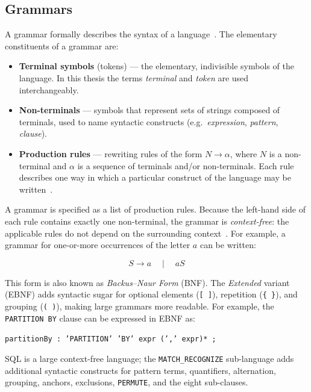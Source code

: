 \subsection{Grammars}
\label{subsec:meth-grammars}

A grammar formally describes the syntax of a language~\cite{DragonBook}.
The elementary constituents of a grammar are:

\begin{itemize}
  \item \textbf{Terminal symbols} (tokens) --- the elementary,
    indivisible symbols of the language.  In this thesis the terms
    \emph{terminal} and \emph{token} are used interchangeably.
  \item \textbf{Non-terminals} --- symbols that represent sets of
    strings composed of terminals, used to name syntactic constructs
    (e.g.\ \emph{expression}, \emph{pattern}, \emph{clause}).
  \item \textbf{Production rules} --- rewriting rules of the form
    $N \to \alpha$, where $N$ is a non-terminal and $\alpha$ is a
    sequence of terminals and/or non-terminals.  Each rule describes
    one way in which a particular construct of the language may be
    written~\cite{wagenknecht2022formal}.
\end{itemize}

A grammar is specified as a list of production rules.  Because the
left-hand side of each rule contains exactly one non-terminal, the
grammar is \emph{context-free}: the applicable rules do not depend
on the surrounding context~\cite{DragonBook}.  For example, a grammar
for one-or-more occurrences of the letter $a$ can be written:

\[
  S \to a \quad\mid\quad aS
\]

This form is also known as \emph{Backus--Naur Form} (BNF).
The \emph{Extended} variant (EBNF) adds syntactic sugar for
optional elements (\texttt{[~]}), repetition (\texttt{\{~\}}), and
grouping (\texttt{(~)}), making large grammars more readable.  For
example, the \texttt{PARTITION~BY} clause can be expressed in EBNF
as:

\begin{center}
  \texttt{partitionBy~:~'PARTITION'~'BY'~expr~(','\ expr)*~;}
\end{center}

SQL is a large context-free language; the \texttt{MATCH\_RECOGNIZE}
sub-language adds additional syntactic constructs for pattern terms,
quantifiers, alternation, grouping, anchors, exclusions,
\texttt{PERMUTE}, and the eight sub-clauses.

